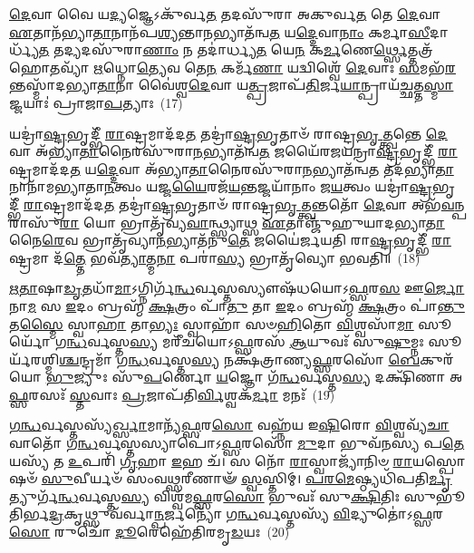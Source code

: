{\anuvakamend[{\-\ul{𑌅}\-\-\ul{𑌵}\-\-\ul{𑌰𑍇} \ul{𑌸}\-𑌪𑍍𑌤𑌦᳴𑌶 𑌚}]}%

\-\ul{𑌦𑍇}\-𑌵𑌾 𑌵𑍈 𑌯\-\ul{𑌦𑍍𑌯}\-𑌜𑍍𑌞𑍇\-𑌽𑌕𑍁᳴𑌰𑍍𑌵\-\ul{𑌤} 𑌤𑌦𑌸𑍁᳴𑌰𑌾 𑌅𑌕𑍁𑌰𑍍𑌵\-\ul{𑌤} 𑌤𑍇 \ul{𑌦𑍇}\-𑌵𑌾 \ul{𑌏}\-𑌤𑌾𑌨᳴𑌭𑍍𑌯𑌾\-\ul{𑌤𑌾}\-𑌨𑌾𑌨᳴𑌪\-\ul{𑌶𑍍𑌯}\-𑌨𑍍𑌤𑌾\-\ul{𑌨}\-𑌭𑍍𑌯𑌾𑌤᳴𑌨𑍍𑌵\-\ul{𑌤} 𑌯\-\ul{𑌦𑍍𑌦𑍇}\-𑌵𑌾\-\ul{𑌨𑌾𑌂} 𑌕𑌰𑍍𑌮𑌾\-\ul{𑌸𑍀}\-𑌦𑌾𑌰𑍍𑌧𑍍𑌯᳴\-\ul{𑌤} 𑌤𑌦𑍍𑌯𑌦𑌸𑍁᳴𑌰𑌾\-\ul{𑌣𑌾𑌂} 𑌨 𑌤𑌦𑌾॑𑌰𑍍𑌧𑍍𑌯\-\ul{𑌤} 𑌯𑍇\-\ul{𑌨} 𑌕\-\ul{𑌰𑍍𑌮}\-𑌣𑍇\-\ul{𑌰𑍍𑌥𑍍𑌸𑍇}\-𑌤𑍍𑌤𑌤𑍍𑌰᳴ 𑌹𑍋\-\ul{𑌤}\-𑌵𑍍𑌯𑌾᳴ \ul{𑌋}\-𑌧𑍍𑌨𑍋\-\ul{𑌤𑍍𑌯𑍇}\-𑌵 𑌤𑍇\-\ul{𑌨} 𑌕𑌰𑍍𑌮᳴\-\ul{𑌣𑌾} 𑌯𑌦𑍍𑌵𑌿𑌶𑍍𑌵𑍇᳴ \ul{𑌦𑍇}\-𑌵𑌾𑌃 \ul{𑌸}\-𑌮𑌭᳴\-\ul{𑌰}\-𑌨𑍍𑌤𑌸𑍍𑌮𑌾᳴𑌦𑌭𑍍𑌯𑌾\-\ul{𑌤𑌾}\-𑌨𑌾 𑌵𑍈॑𑌶𑍍𑌵\-\ul{𑌦𑍇}\-𑌵𑌾 𑌯\-\ul{𑌤𑍍𑌪𑍍𑌰}\-𑌜𑌾𑌪᳴\-\ul{𑌤𑌿}\-𑌰𑍍𑌜\-\ul{𑌯𑌾}\-𑌨𑍍𑌪𑍍𑌰𑌾𑌯᳴\-\ul{𑌚𑍍𑌛}\-𑌤𑍍𑌤\-\ul{𑌸𑍍𑌮𑌾}\-𑌜𑍍𑌜𑌯𑌾𑌃॑ 𑌪𑍍𑌰𑌾𑌜𑌾\-\ul{𑌪}\-𑌤𑍍𑌯𑌾𑌃~(17)

𑌯𑌦𑍍𑌰𑌾॑\-\ul{𑌷𑍍𑌟𑍍𑌰}\-𑌭𑍃𑌦𑍍𑌭𑍀᳴ \ul{𑌰𑌾}\-𑌷𑍍𑌟𑍍𑌰𑌮𑌾𑌦᳴𑌦\-\ul{𑌤} 𑌤𑌦𑍍𑌰𑌾॑\-\ul{𑌷𑍍𑌟𑍍𑌰}\-𑌭𑍃𑌤𑌾𑍞᳴ 𑌰𑌾𑌷𑍍𑌟𑍍𑌰\-\ul{𑌭𑍃}\-𑌤𑍍𑌤𑍍𑌵𑌨𑍍𑌤𑍇 \ul{𑌦𑍇}\-𑌵𑌾 𑌅᳴𑌭𑍍𑌯𑌾\-\ul{𑌤𑌾}\-𑌨𑍈𑌰𑌸𑍁᳴𑌰𑌾\-\ul{𑌨}\-𑌭𑍍𑌯𑌾𑌤᳴𑌨𑍍𑌵\-\ul{𑌤} 𑌜𑌯𑍈᳴𑌰𑌜𑌯𑌨𑍍𑌰𑌾\-\ul{𑌷𑍍𑌟𑍍𑌰}\-𑌭𑍃𑌦𑍍𑌭𑍀᳴ \ul{𑌰𑌾}\-𑌷𑍍𑌟𑍍𑌰𑌮𑌾𑌦᳴𑌦\-\ul{𑌤} 𑌯\-\ul{𑌦𑍍𑌦𑍇}\-𑌵𑌾 𑌅᳴𑌭𑍍𑌯𑌾\-\ul{𑌤𑌾}\-𑌨𑍈𑌰𑌸𑍁᳴𑌰𑌾\-\ul{𑌨}\-𑌭𑍍𑌯𑌾𑌤᳴𑌨𑍍𑌵\-\ul{𑌤} 𑌤𑌦᳴𑌭𑍍𑌯𑌾\-\ul{𑌤𑌾}\-𑌨𑌾𑌨𑌾᳴𑌮𑌭𑍍𑌯𑌾𑌤𑌾\-\ul{𑌨}\-𑌤𑍍𑌵𑌂 𑌯𑌜𑍍𑌜\-\ul{𑌯𑍈}\-𑌰𑌜᳴\-\ul{𑌯}\-𑌨𑍍𑌤𑌜𑍍𑌜𑌯𑌾᳴𑌨𑌾𑌂 𑌜\-\ul{𑌯}\-𑌤𑍍𑌵𑌂 𑌯𑌦𑍍𑌰𑌾॑\-\ul{𑌷𑍍𑌟𑍍𑌰}\-𑌭𑍃𑌦𑍍𑌭𑍀᳴ \ul{𑌰𑌾}\-𑌷𑍍𑌟𑍍𑌰𑌮𑌾𑌦᳴𑌦\-\ul{𑌤} 𑌤𑌦𑍍𑌰𑌾॑\-\ul{𑌷𑍍𑌟𑍍𑌰}\-𑌭𑍃𑌤𑌾𑍞᳴ 𑌰𑌾𑌷𑍍𑌟𑍍𑌰\-\ul{𑌭𑍃}\-𑌤𑍍𑌤𑍍𑌵𑌨𑍍𑌤𑌤𑍋᳴ \ul{𑌦𑍇}\-𑌵𑌾 𑌅𑌭᳴\-\ul{𑌵}\-𑌨𑍍𑌪𑌰𑌾𑌸𑍁᳴\-\ul{𑌰𑌾} 𑌯𑍋 𑌭𑍍𑌰𑌾𑌤𑍃᳴𑌵𑍍𑌯\-\ul{𑌵𑌾}\-𑌨𑍍𑌥𑍍𑌸𑍍𑌯𑌾𑌥𑍍𑌸 \ul{𑌏}\-𑌤𑌾𑌞𑍍𑌜𑍁᳴𑌹𑍁𑌯𑌾𑌦𑌭𑍍𑌯𑌾\-\ul{𑌤𑌾}\-𑌨𑍈\-\ul{𑌰𑍇}\-𑌵 𑌭𑍍𑌰𑌾𑌤𑍃᳴𑌵𑍍𑌯𑌾\-\ul{𑌨}\-𑌭𑍍𑌯𑌾𑌤᳴𑌨𑍁\-\ul{𑌤𑍇} 𑌜𑌯𑍈॑𑌰𑍍𑌜𑌯𑌤𑌿 𑌰𑌾\-\ul{𑌷𑍍𑌟𑍍𑌰}\-𑌭𑍃𑌦𑍍𑌭𑍀᳴ \ul{𑌰𑌾}\-𑌷𑍍𑌟𑍍𑌰𑌮𑌾 𑌦᳴\-\ul{𑌤𑍍𑌤𑍇} 𑌭𑌵᳴\-\ul{𑌤𑍍𑌯𑌾}\-𑌤𑍍𑌮\-\ul{𑌨𑌾} 𑌪𑌰𑌾॑\-\ul{𑌸𑍍𑌯} 𑌭𑍍𑌰𑌾𑌤𑍃᳴𑌵𑍍𑌯𑍋 𑌭𑌵𑌤𑌿॥~(18)

{\anuvakamend[{\-\ul{𑌪𑍍𑌰𑌾}\-\-\ul{𑌜𑌾}\-\-\ul{𑌪}\-𑌤𑍍𑌯𑌾𑌃 𑌸𑍋॑\-𑌽𑌷𑍍𑌟𑌾𑌦᳴𑌶 𑌚}]}%

\-\ul{𑌋}\-\-\ul{𑌤𑌾}\-𑌷𑌾\-\ul{𑌡𑍃}\-𑌤𑌧𑌾᳴\-\ul{𑌮𑌾}\-\-𑌽𑌗𑍍𑌨𑌿𑌰𑍍𑌗᳴\-\ul{𑌨𑍍𑌧}\-𑌰𑍍𑌵𑌸𑍍𑌤𑌸𑍍𑌯𑍗𑌷᳴𑌧𑌯𑍋\-𑌽\-\ul{𑌫𑍍𑌸}\-𑌰\-\ul{𑌸} 𑌊\-\ul{𑌰𑍍𑌜𑍋} 𑌨𑌾\-\ul{𑌮} 𑌸 \ul{𑌇}\-𑌦𑌂 𑌬𑍍𑌰𑌹𑍍𑌮᳴ \ul{𑌕𑍍𑌷}\-𑌤𑍍𑌰𑌂 𑌪𑌾᳴\-\ul{𑌤𑍁} 𑌤𑌾 \ul{𑌇}\-𑌦𑌂 𑌬𑍍𑌰𑌹𑍍𑌮᳴ \ul{𑌕𑍍𑌷}\-𑌤𑍍𑌰𑌂 𑌪𑌾॑\-\ul{𑌨𑍍𑌤𑍁} 𑌤\-\ul{𑌸𑍍𑌮𑍈} 𑌸𑍍𑌵𑌾\-\ul{𑌹𑌾} 𑌤𑌾\-\ul{𑌭𑍍𑌯𑌃} 𑌸𑍍𑌵𑌾𑌹𑌾᳴ 𑌸𑍞\-\ul{𑌹𑌿}\-𑌤𑍋 \ul{𑌵𑌿}\-𑌶𑍍𑌵𑌸𑌾᳴\-\ul{𑌮𑌾} 𑌸𑍂𑌰𑍍𑌯𑍋᳴ 𑌗\-\ul{𑌨𑍍𑌧}\-𑌰𑍍𑌵𑌸𑍍𑌤\-\ul{𑌸𑍍𑌯} 𑌮𑌰𑍀᳴𑌚𑌯𑍋\-𑌽\-\ul{𑌫𑍍𑌸}\-𑌰𑌸᳴ \ul{𑌆}\-𑌯𑍁𑌵𑌃᳴ 𑌸𑍁\-\ul{𑌷𑍁}\-𑌮𑍍𑌨𑌃 𑌸𑍂𑌰𑍍𑌯᳴𑌰𑌶𑍍𑌮𑌿\-\ul{𑌶𑍍𑌚}\-𑌨𑍍𑌦𑍍𑌰𑌮𑌾᳴ 𑌗\-\ul{𑌨𑍍𑌧}\-𑌰𑍍𑌵𑌸𑍍𑌤\-\ul{𑌸𑍍𑌯} 𑌨𑌕𑍍𑌷᳴𑌤𑍍𑌰𑌾𑌣𑍍𑌯\-\ul{𑌫𑍍𑌸}\-𑌰𑌸𑍋᳴ \ul{𑌬𑍇}\-𑌕𑍁𑌰᳴𑌯𑍋 \ul{𑌭𑍁}\-𑌜𑍍𑌯𑍁𑌃 𑌸𑍁᳴\-\ul{𑌪}\-𑌰𑍍𑌣𑍋 \ul{𑌯}\-𑌜𑍍𑌞𑍋 𑌗᳴\-\ul{𑌨𑍍𑌧}\-𑌰𑍍𑌵𑌸𑍍𑌤\-\ul{𑌸𑍍𑌯} 𑌦𑌕𑍍𑌷𑌿᳴𑌣𑌾 𑌅\-\ul{𑌫𑍍𑌸}\-𑌰𑌸𑌃᳴ \ul{𑌸𑍍𑌤}\-𑌵𑌾𑌃 \ul{𑌪𑍍𑌰}\-𑌜𑌾𑌪᳴𑌤𑌿\-\ul{𑌰𑍍𑌵𑌿}\-𑌶𑍍𑌵𑌕᳴\-\ul{𑌰𑍍𑌮𑌾} 𑌮𑌨𑌃᳴~(19)

\-\ul{𑌗}\-\-\ul{𑌨𑍍𑌧}\-𑌰𑍍𑌵𑌸𑍍𑌤𑌸𑍍𑌯᳴\-\ul{𑌰𑍍𑌖𑍍𑌸𑌾}\-𑌮𑌾𑌨𑍍𑌯᳴\-\ul{𑌫𑍍𑌸}\-𑌰\-\ul{𑌸𑍋} 𑌵𑌹𑍍𑌨᳴𑌯 𑌇\-\ul{𑌷𑌿}\-𑌰𑍋 \ul{𑌵𑌿}\-𑌶𑍍𑌵𑌵𑍍𑌯᳴\-\ul{𑌚𑌾} 𑌵𑌾𑌤𑍋᳴ 𑌗\-\ul{𑌨𑍍𑌧}\-𑌰𑍍𑌵𑌸𑍍𑌤𑌸𑍍𑌯𑌾𑌪𑍋॑\-𑌽\-\ul{𑌫𑍍𑌸}\-𑌰𑌸𑍋᳴ \ul{𑌮𑍁}\-𑌦𑌾 𑌭𑍁𑌵᳴𑌨𑌸𑍍𑌯 𑌪\-\ul{𑌤𑍇} 𑌯𑌸𑍍𑌯᳴ 𑌤 \ul{𑌉}\-𑌪𑌰𑌿᳴ \ul{𑌗𑍃}\-𑌹𑌾 \ul{𑌇}\-𑌹 𑌚᳴। 𑌸 𑌨𑍋᳴ \ul{𑌰𑌾}\-𑌸𑍍𑌵𑌾𑌜𑍍𑌯𑌾᳴𑌨𑌿𑍞 \ul{𑌰𑌾}\-𑌯𑌸𑍍𑌪𑍋𑌷𑍞᳴ \ul{𑌸𑍁}\-𑌵𑍀𑌰𑍍𑌯𑍞᳴ 𑌸𑌂𑌵\-\ul{𑌥𑍍𑌸}\-𑌰𑍀𑌣𑌾𑍟᳴ \ul{𑌸𑍍𑌵}\-𑌸𑍍𑌤𑌿𑌮𑍍। \ul{𑌪}\-\-\ul{𑌰}\-\-\ul{𑌮𑍇}\-𑌷𑍍𑌠𑍍𑌯𑌧𑌿᳴𑌪𑌤𑌿\-\-\ul{𑌰𑍍𑌮𑍃}\-𑌤𑍍𑌯𑍁𑌰𑍍𑌗᳴\-\ul{𑌨𑍍𑌧}\-𑌰𑍍𑌵𑌸𑍍𑌤\-\ul{𑌸𑍍𑌯} 𑌵𑌿𑌶𑍍𑌵᳴𑌮\-\ul{𑌫𑍍𑌸}\-𑌰\-\ul{𑌸𑍋} 𑌭𑍁𑌵𑌃᳴ 𑌸𑍁\-\ul{𑌕𑍍𑌷𑌿}\-𑌤𑌿𑌃 𑌸𑍁𑌭𑍂᳴𑌤𑌿𑌰𑍍𑌭\-\ul{𑌦𑍍𑌰}\-𑌕𑍃𑌥𑍍𑌸𑍁𑌵᳴𑌰𑍍𑌵𑌾\-\ul{𑌨𑍍𑌪}\-𑌰𑍍𑌜𑌨𑍍𑌯𑍋᳴ 𑌗\-\ul{𑌨𑍍𑌧}\-𑌰𑍍𑌵𑌸𑍍𑌤𑌸𑍍𑌯᳴ \ul{𑌵𑌿}\-𑌦𑍍𑌯𑍁𑌤𑍋॑\-𑌽\-\ul{𑌫𑍍𑌸}\-𑌰\-\ul{𑌸𑍋} 𑌰𑍁𑌚𑍋᳴ \ul{𑌦𑍂}\-𑌰𑍇𑌹𑍇᳴𑌤𑌿𑌰𑌮𑍃\-\ul{𑌡}\-𑌯𑌃~(20)

